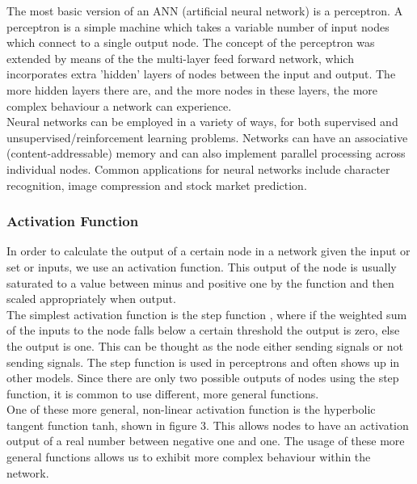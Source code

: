 \documentclass[12pt,a4paper]{article}
\begin{document}
The most basic version of an ANN (artificial neural network) is a perceptron. A perceptron is a simple machine which takes a variable number of input nodes which connect to a single output node. \cite{percept} The concept of the perceptron was extended by means of the the multi-layer feed forward network, which incorporates extra 'hidden' layers of nodes between the input and output. The more hidden layers there are, and the more nodes in these layers, the more complex behaviour a network can experience. \cite{ffann}\\

Neural networks can be employed in a variety of ways, for both supervised and unsupervised/reinforcement learning problems. Networks can have an associative (content-addressable) memory and can also implement parallel processing across individual nodes. \cite{nnm} Common applications for neural networks include character recognition, image compression and stock market prediction. \cite{nnapps}
\begin{figure}[h]
\end{figure}
\newpage
\subsubsection*{Activation Function}
In order to calculate the output of a certain node in a network given the input or set or inputs, we use an activation function. \cite{activate} This output of the node is usually saturated to a value between minus and positive one by the function and then scaled appropriately when output. \cite{swarmann} \\

The simplest activation function is the step function \cite{nnm}, where if the weighted sum of the inputs to the node falls below a certain threshold the output is zero, else the output is one. This can be thought as the node either sending signals or not sending signals. The step function is used in perceptrons and often shows up in other models. \cite{percept} Since there are only two possible outputs of nodes using the step function, it is common to use different, more general functions.\\

One of these more general, non-linear activation function is the hyperbolic tangent function tanh, shown in figure 3. This allows nodes to have an activation output of a real number between negative one and one. The usage of these more general functions allows us to exhibit more complex behaviour within the network.
\begin{figure}[h]
\end{figure}
\newpage
\end{document}
